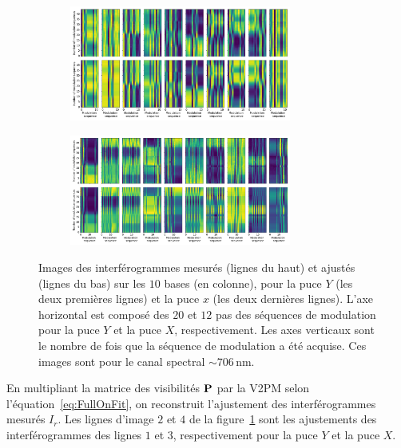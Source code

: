 \begin{figure}[ht!]
    \begin{subfigure}{\textwidth}
        \centering
        \includegraphics[width=0.8\textwidth]{Figure_Chap3/20221010_FringeFitting_TemporalModulation_Pola1_Base_LaTex.png}
    \end{subfigure}
    \begin{subfigure}{\textwidth}
        \centering
        \includegraphics[width=0.8\textwidth]{Figure_Chap3/20220811_FringeFitting_TemporalModulation_Pola1_Base_LaTex.png}
    \end{subfigure}
    \caption[Interférogrammes mesurés et ajustés par la P2VM des puces $Y$ et $X$ mesurés sur FIRSTv2.]{Images des interférogrammes mesurés (lignes du haut) et ajustés (lignes du bas) sur les $10$ bases (en colonne), pour la puce $Y$ (les deux premières lignes) et la puce $x$ (les deux dernières lignes). L'axe horizontal est composé des $20$ et $12$ pas des séquences de modulation pour la puce $Y$ et la puce $X$, respectivement. Les axes verticaux sont le nombre de fois que la séquence de modulation a été acquise. Ces images sont pour le canal spectral $\sim 706 \,$nm.}
    \label{fig:FullOnData}
\end{figure}

En multipliant la matrice des visibilités $\text{\textbf{P}}$ par la \ac{V2PM} selon l'équation~\ref{eq:FullOnFit}, on reconstruit l'ajustement des interférogrammes mesurés $I_r$. Les lignes d'image $2$ et $4$ de la figure~\ref{fig:FullOnData} sont les ajustements des interférogrammes des lignes $1$ et $3$, respectivement pour la puce $Y$ et la puce $X$.


